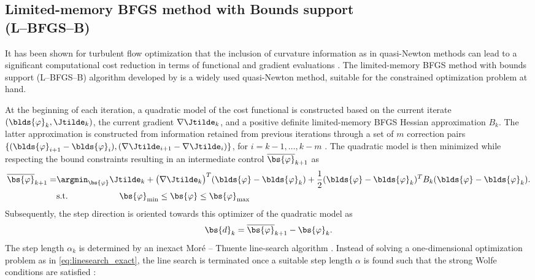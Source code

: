 	\subsection{Limited-memory BFGS method with Bounds support\\(L--BFGS--B)}
	It has been shown for turbulent flow optimization that the inclusion of curvature information as in quasi-Newton methods can lead to a significant computational cost reduction in terms of functional and gradient evaluations \citep{nita2016efficiency}. The limited-memory BFGS method with bounds support (L--BFGS--B) algorithm developed by \cite{byrd1995limited} is a widely used quasi-Newton method, suitable for the constrained optimization problem at hand. 
	
	At the beginning of each iteration, a quadratic model of the cost functional is constructed based on the current iterate $(\blds{\varphi}_k, \Jtilde_k)$, the current gradient $\nabla \Jtilde_k$, and a positive definite limited-memory BFGS Hessian approximation $B_k$. The latter approximation is constructed from information retained from previous iterations through a set of $m$ correction pairs $\{(\blds{\varphi}_{i+1}- \blds{\varphi}_i), (\nabla \Jtilde_{i+1} - \nabla \Jtilde_i)\}$, for $i = k-1, \dots, k-m$ \citep{liu1989limited}. The quadratic model is then minimized while respecting the bound constraints resulting in an intermediate control $\overline{\bs{\varphi}}_{k+1}$ as 
	\begin{align}
	\overline{\bs{\varphi}}_{k+1} = &\argmin_{\bs{\varphi}}{\Jtilde_k + \big(\nabla \Jtilde_k\big)^T (\blds{\varphi} - \blds{\varphi}_k) + \frac{1}{2} (\blds{\varphi} - \blds{\varphi}_k)^T B_k (\blds{\varphi} - \blds{\varphi}_k)}. \nonumber\\
		&{\rm s.t.} \qquad \qquad \qquad \bs{\varphi}_{\rm min} \leq \bs{\varphi} \leq \bs{\varphi}_{\rm max}
	\end{align}
	Subsequently, the step direction is oriented towards this optimizer of the quadratic model as
	\begin{equation}
		\bs{d}_k = \overline{\bs{\varphi}}_{k+1} - \bs{\varphi}_k. 
	\end{equation}
	The step length $\alpha_k$ is determined by an inexact Mor\'e -- Thuente line-search algorithm \citep{more1994line}. Instead of solving a one-dimensional optimization problem as in \eqref{eq:linesearch_exact}, the line search is terminated once a suitable step length $\alpha$ is found such that the strong Wolfe conditions are satisfied \citep{wolfe1969convergence, wolfe1971convergence}:
